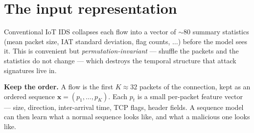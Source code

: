 \documentclass[11pt,a4paper]{article}
\begin{document}
\section{The input representation}

Conventional IoT IDS collapses each flow into a vector of $\sim$80 summary statistics (mean packet size, IAT standard deviation, flag counts, $\ldots$) before the model sees it. This is convenient but \emph{permutation-invariant} --- shuffle the packets and the statistics do not change --- which destroys the temporal structure that attack signatures live in.

\begin{tcolorbox}[idea]
\textbf{Keep the order.} A flow is the first $K\!\approx\!32$ packets of the connection, kept as an ordered sequence $\mathbf{x} = (p_1, \ldots, p_K)$. Each $p_t$ is a small per-packet feature vector --- size, direction, inter-arrival time, TCP flags, header fields. A sequence model can then learn what a normal sequence looks like, and what a malicious one looks like.
\end{tcolorbox}
\end{document}
